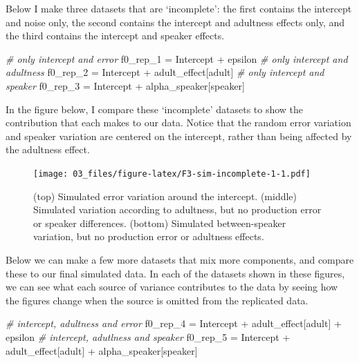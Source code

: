 \documentclass[
]{book}
\newenvironment{Shaded}{\begin{snugshade}}{\end{snugshade}}
\newcommand{\CommentTok}[1]{\textcolor[rgb]{0.56,0.35,0.01}{\textit{#1}}}
\newcommand{\NormalTok}[1]{#1}
\newcommand{\OtherTok}[1]{\textcolor[rgb]{0.56,0.35,0.01}{#1}}
\newcommand{\SpecialCharTok}[1]{\textcolor[rgb]{0.00,0.00,0.00}{#1}}
\begin{document}
Below I make three datasets that are `incomplete': the first contains the intercept and noise only, the second contains the intercept and adultness effects only, and the third contains the intercept and speaker effects.

\begin{Shaded}
\begin{Highlighting}[]
\CommentTok{\# only intercept and error}
\NormalTok{f0\_rep\_1 }\OtherTok{=}\NormalTok{ Intercept }\SpecialCharTok{+}\NormalTok{ epsilon}
\CommentTok{\# only intercept and adultness}
\NormalTok{f0\_rep\_2 }\OtherTok{=}\NormalTok{ Intercept }\SpecialCharTok{+}\NormalTok{ adult\_effect[adult]}
\CommentTok{\# only intercept and speaker}
\NormalTok{f0\_rep\_3 }\OtherTok{=}\NormalTok{ Intercept }\SpecialCharTok{+}\NormalTok{ alpha\_speaker[speaker]}
\end{Highlighting}
\end{Shaded}

In the figure below, I compare these `incomplete' datasets to show the contribution that each makes to our data. Notice that the random error variation and speaker variation are centered on the intercept, rather than being affected by the adultness effect.

\begin{figure}
\centering
\texttt{[image: 03\_files/figure-latex/F3-sim-incomplete-1-1.pdf]}
\caption{\label{fig:F3-sim-incomplete-1}(top) Simulated error variation around the intercept. (middle) Simulated variation according to adultness, but no production error or speaker differences. (bottom) Simulated between-speaker variation, but no production error or adultness effects.}
\end{figure}

Below we can make a few more datasets that mix more components, and compare these to our final simulated data. In each of the datasets shown in these figures, we can see what each source of variance contributes to the data by seeing how the figures change when the source is omitted from the replicated data.

\begin{Shaded}
\begin{Highlighting}[]
\CommentTok{\# intercept, adultness and error}
\NormalTok{f0\_rep\_4 }\OtherTok{=}\NormalTok{ Intercept }\SpecialCharTok{+}\NormalTok{ adult\_effect[adult] }\SpecialCharTok{+}\NormalTok{ epsilon}
\CommentTok{\# intercept, adutlness and speaker}
\NormalTok{f0\_rep\_5 }\OtherTok{=}\NormalTok{ Intercept }\SpecialCharTok{+}\NormalTok{ adult\_effect[adult] }\SpecialCharTok{+}\NormalTok{ alpha\_speaker[speaker]}
\end{Highlighting}
\end{Shaded}
\end{document}
